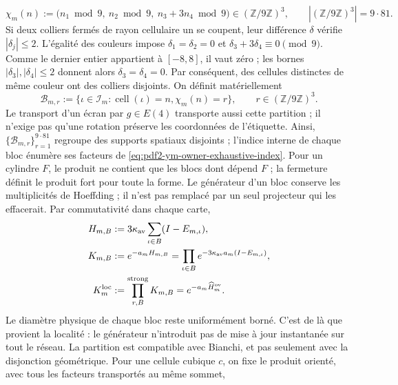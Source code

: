 \begin{equation}\label{eq:pdf2-ym-owner-729-coloring}
 \chi_m(n):=
 \bigl(n_1\bmod9,\ n_2\bmod9,\ n_3+3n_4\bmod9\bigr)
 \in(\mathbb Z/9\mathbb Z)^3,
 \qquad |(\mathbb Z/9\mathbb Z)^3|=9\cdot81.
\end{equation}
Si deux colliers fermés de rayon cellulaire un se coupent, leur différence
$\delta$ vérifie $|\delta_j|\le2$. L’égalité des couleurs impose
$\delta_1=\delta_2=0$ et
$\delta_3+3\delta_4\equiv0\pmod9$. Comme le dernier entier appartient à
$[-8,8]$, il vaut zéro ; les bornes $|\delta_3|,|\delta_4|\le2$ donnent alors
$\delta_3=\delta_4=0$. Par conséquent, des cellules distinctes de même couleur ont
des colliers disjoints. On définit matériellement
\begin{equation}\label{eq:pdf2-ym-owner-729-blocks}
 \mathcal B_{m,r}:=\{\iota\in\mathcal I_m:
   \operatorname{cell}(\iota)=n, \chi_m(n)=r\},
 \qquad r\in(\mathbb Z/9\mathbb Z)^3.
\end{equation}
Le transport d’un écran par $g\in E(4)$ transporte aussi cette
partition ; il n’exige pas qu’une rotation préserve les coordonnées de l’étiquette.
Ainsi, $\{\mathcal B_{m,r}\}_{r=1}^{9\cdot81}$ regroupe des supports spatiaux
disjoints ;
l’indice interne de chaque bloc énumère ses facteurs de
\eqref{eq:pdf2-ym-owner-exhaustive-index}. Pour un cylindre $F$, le produit ne
contient que les blocs dont dépend $F$ ; la fermeture définit le produit fort
pour toute la forme. Le générateur d’un bloc conserve les multiplicités de
Hoeffding ; il n’est pas remplacé par un seul projecteur qui les effacerait. Par
commutativité dans chaque carte,
\begin{equation}\label{eq:pdf2-ym-owner-local-circuit}
\begin{aligned}
 H_{m,B}&:=3\kappa_{\rm av}\sum_{\iota\in B}(I-E_{m,\iota}),\\
 K_{m,B}&:=e^{-a_mH_{m,B}}
 =\prod_{\iota\in B}e^{-3\kappa_{\rm av}a_m(I-E_{m,\iota})},\\
 K_m^{\rm loc}&:=\mathop{\prod_{r,B}}^{\rm strong}K_{m,B}
 =e^{-a_m\widehat H_m^{\rm ov}}.
\end{aligned}
\end{equation}
Le diamètre physique de chaque bloc reste uniformément borné. C'est de là que provient la localité : le générateur n'introduit pas de mise à jour instantanée sur tout le réseau.
La partition est compatible avec Bianchi, et pas seulement avec la disjonction géométrique. Pour une cellule cubique $c$, on fixe le produit orienté, avec tous les facteurs transportés au même sommet,
